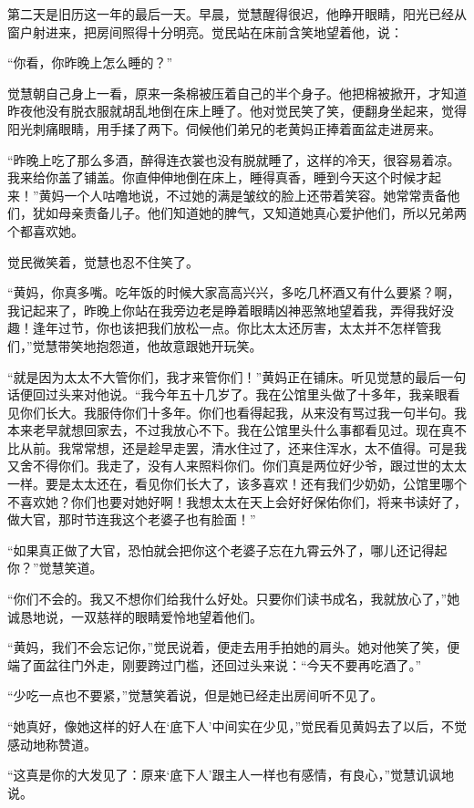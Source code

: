 \par 第二天是旧历这一年的最后一天。早晨，觉慧醒得很迟，他睁开眼睛，阳光已经从窗户射进来，把房间照得十分明亮。觉民站在床前含笑地望着他，说：
\par “你看，你昨晚上怎么睡的？”
\par 觉慧朝自己身上一看，原来一条棉被压着自己的半个身子。他把棉被掀开，才知道昨夜他没有脱衣服就胡乱地倒在床上睡了。他对觉民笑了笑，便翻身坐起来，觉得阳光刺痛眼睛，用手揉了两下。伺候他们弟兄的老黄妈正捧着面盆走进房来。
\par “昨晚上吃了那么多酒，醉得连衣裳也没有脱就睡了，这样的冷天，很容易着凉。我来给你盖了铺盖。你直伸伸地倒在床上，睡得真香，睡到今天这个时候才起来！”黄妈一个人咕噜地说，不过她的满是皱纹的脸上还带着笑容。她常常责备他们，犹如母亲责备儿子。他们知道她的脾气，又知道她真心爱护他们，所以兄弟两个都喜欢她。
\par 觉民微笑着，觉慧也忍不住笑了。
\par “黄妈，你真多嘴。吃年饭的时候大家高高兴兴，多吃几杯酒又有什么要紧？啊，我记起来了，昨晚上你站在我旁边老是睁着眼睛凶神恶煞地望着我，弄得我好没趣！逢年过节，你也该把我们放松一点。你比太太还厉害，太太并不怎样管我们，”觉慧带笑地抱怨道，他故意跟她开玩笑。
\par “就是因为太太不大管你们，我才来管你们！”黄妈正在铺床。听见觉慧的最后一句话便回过头来对他说。“我今年五十几岁了。我在公馆里头做了十多年，我亲眼看见你们长大。我服侍你们十多年。你们也看得起我，从来没有骂过我一句半句。我本来老早就想回家去，不过我放心不下。我在公馆里头什么事都看见过。现在真不比从前。我常常想，还是趁早走罢，清水住过了，还来住浑水，太不值得。可是我又舍不得你们。我走了，没有人来照料你们。你们真是两位好少爷，跟过世的太太一样。要是太太还在，看见你们长大了，该多喜欢！还有我们少奶奶，公馆里哪个不喜欢她？你们也要对她好啊！我想太太在天上会好好保佑你们，将来书读好了，做大官，那时节连我这个老婆子也有脸面！”
\par “如果真正做了大官，恐怕就会把你这个老婆子忘在九霄云外了，哪儿还记得起你？”觉慧笑道。
\par “你们不会的。我又不想你们给我什么好处。只要你们读书成名，我就放心了，”她诚恳地说，一双慈祥的眼睛爱怜地望着他们。
\par “黄妈，我们不会忘记你，”觉民说着，便走去用手拍她的肩头。她对他笑了笑，便端了面盆往门外走，刚要跨过门槛，还回过头来说：“今天不要再吃酒了。”
\par “少吃一点也不要紧，”觉慧笑着说，但是她已经走出房间听不见了。
\par “她真好，像她这样的好人在‘底下人’中间实在少见，”觉民看见黄妈去了以后，不觉感动地称赞道。
\par “这真是你的大发见了：原来‘底下人’跟主人一样也有感情，有良心，”觉慧讥讽地说。
